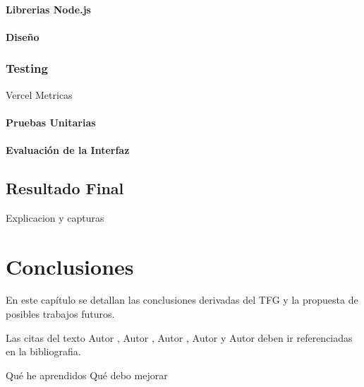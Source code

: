 \documentclass[12pt,twoside,titlepage]{report}
\newcommand\blankpage{%
    \newpage
    \null
    \thispagestyle{empty}%
    \newpage}
\begin{document}
\subsubsection{Librerias Node.js}
\subsubsection{Diseño}

\subsection{Testing}

Vercel Metricas

\subsubsection{Pruebas Unitarias}
\subsubsection{Evaluación de la Interfaz}

\section{Resultado Final}

Explicacion y capturas

\newpage

\chapter{Conclusiones}

En este capítulo se detallan las conclusiones derivadas del TFG y la propuesta de posibles trabajos futuros.

Las citas del texto Autor \cite{giaquinta}, Autor \cite{fortune}, Autor \cite{fortuneB}, Autor \cite{mitchell} y Autor \cite{morrey} deben ir referenciadas en la bibliografia.


Qué he aprendidos
Qué debo mejorar

\blankpage




{}
\footnotesize{
%


}
\raggedbottom
\afterpage{\blankpage}
\newpage
\end{document}

